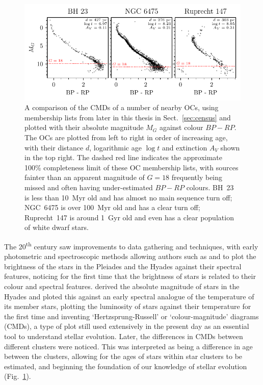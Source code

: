 \begin{figure}[tb]
	\includegraphics[width=\textwidth]{fig/c1/cmd_comparison.pdf}
	\caption[A comparison of the CMDs of a number of nearby OCs]{A comparison of the CMDs of a number of nearby OCs, using membership lists from later in this thesis in Sect.~\ref{sec:census} and plotted with their absolute magnitude $M_G$ against colour $BP - RP$. The OCs are plotted from left to right in order of increasing age, with their distance $d$, logarithmic age $\log t$ and extinction $A_V$ shown in the top right. The dashed red line indicates the approximate 100\% completeness limit of these OC membership lists, with sources fainter than an apparent magnitude of $G=18$ frequently being missed and often having under-estimated $BP-RP$ colours. BH~23 is less than 10~Myr old and has almost no main sequence turn off; NGC~6475 is over 100~Myr old and has a clear turn off; Ruprecht~147 is around 1~Gyr old and even has a clear population of white dwarf stars.}
	\label{fig:intro:history:cmds}
\end{figure}

The 20\textsuperscript{th} century saw improvements to data gathering and techniques, with early photometric and spectroscopic methods allowing authors such as \cite{rosenberg_uber_zusammenhang_1910} and \cite{hertzsprung_ueber_verwendung_1911} to plot the brightness of the stars in the Pleiades and the Hyades against their spectral features, noticing for the first time that the brightness of stars is related to their colour and spectral features. \cite{russell_relations_spectra_1914} derived the absolute magnitude of stars in the Hyades and ploted this against an early spectral analogue of the temperature of its member stars, plotting the luminosity of stars against their temperature for the first time and inventing `Hertzsprung-Russell' or `colour-magnitude' diagrams (CMDs), a type of plot still used extensively in the present day as an essential tool to understand stellar evolution. Later, the differences in CMDs between different clusters were noticed. This was interpreted as being a difference in age between the clusters, allowing for the ages of stars within star clusters to be estimated, and beginning the foundation of our knowledge of stellar evolution (Fig.~\ref{fig:intro:history:cmds}).

